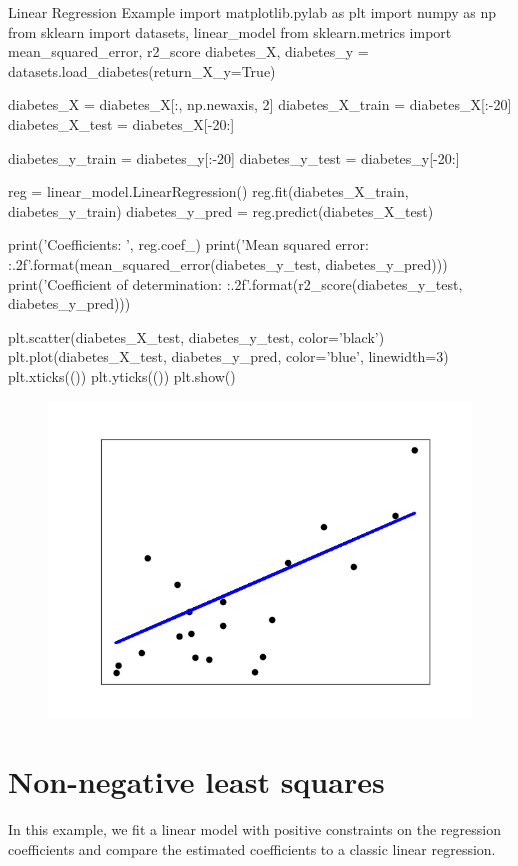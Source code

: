 \begin{py}{Linear Regression Example}
import matplotlib.pylab as plt
import numpy as np
from sklearn import datasets, linear_model
from sklearn.metrics import mean_squared_error, r2_score
diabetes_X, diabetes_y = datasets.load_diabetes(return_X_y=True)

diabetes_X = diabetes_X[:, np.newaxis, 2]
diabetes_X_train = diabetes_X[:-20]
diabetes_X_test = diabetes_X[-20:]

diabetes_y_train = diabetes_y[:-20]
diabetes_y_test = diabetes_y[-20:]

reg = linear_model.LinearRegression()
reg.fit(diabetes_X_train, diabetes_y_train)
diabetes_y_pred = reg.predict(diabetes_X_test)

print('Coefficients: \n', reg.coef_)
print('Mean squared error: {:.2f}'.format(mean_squared_error(diabetes_y_test, diabetes_y_pred)))
print('Coefficient of determination: {:.2f}'.format(r2_score(diabetes_y_test, diabetes_y_pred)))

plt.scatter(diabetes_X_test, diabetes_y_test, color='black')
plt.plot(diabetes_X_test, diabetes_y_pred, color='blue', linewidth=3)
plt.xticks(())
plt.yticks(())
plt.show()
\end{py}
\begin{figure}
\centering
\includegraphics{img/Linear Regression Example.png}
\end{figure}


\section{Non-negative least squares\label{Non-negative least squares}}
In this example, we fit a linear model with positive constraints on the regression coefficients and compare the estimated coefficients to a classic linear regression.

